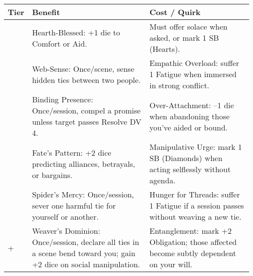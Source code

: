 \begin{longtable}{>{\raggedright\arraybackslash}p{1cm} p{5cm} p{5cm}}
\toprule
\textbf{Tier} & \textbf{Benefit} & \textbf{Cost / Quirk} \\
\midrule
1 & Hearth-Blessed: +1 die to Comfort or Aid. & Must offer solace when asked, or mark 1 SB (Hearts). \\
\midrule
2 & Web-Sense: Once/scene, sense hidden ties between two people. & Empathic Overload: suffer 1 Fatigue when immersed in strong conflict. \\
\midrule
3 & Binding Presence: Once/session, compel a promise unless target passes Resolve DV 4. & Over-Attachment: –1 die when abandoning those you’ve aided or bound. \\
\midrule
4 & Fate’s Pattern: +2 dice predicting alliances, betrayals, or bargains. & Manipulative Urge: mark 1 SB (Diamonds) when acting selflessly without agenda. \\
\midrule
5 & Spider’s Mercy: Once/session, sever one harmful tie for yourself or another. & Hunger for Threads: suffer 1 Fatigue if a session passes without weaving a new tie. \\
\midrule
6+ & Weaver’s Dominion: Once/session, declare all ties in a scene bend toward you; gain +2 dice on social manipulation. & Entanglement: mark +2 Obligation; those affected become subtly dependent on your will. \\
\bottomrule
\end{longtable}